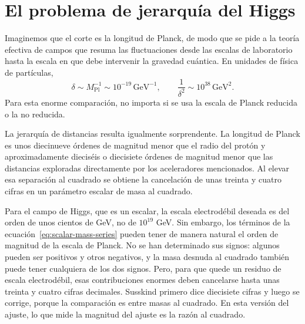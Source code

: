 \begin{classroomqa}
\end{classroomqa}

\begin{classroomqa}
\end{classroomqa}

\section{El problema de jerarquía del Higgs}

Imaginemos que el corte es la longitud de Planck, de modo que se pide a la teoría efectiva de campos que resuma las fluctuaciones desde las escalas de laboratorio hasta la escala en que debe intervenir la gravedad cuántica.
En unidades de física de partículas,
\begin{equation}
\delta\sim M_{\mathrm{Pl}}^{-1}\sim10^{-19}\,\mathrm{GeV}^{-1},
\qquad
\frac{1}{\delta^2}\sim10^{38}\,\mathrm{GeV}^2.
\label{eq:planck-cutoff}
\end{equation}
Para esta enorme comparación, no importa si se usa la escala de Planck reducida o la no reducida.

La jerarquía de distancias resulta igualmente sorprendente. La longitud de Planck es unos diecinueve órdenes de magnitud menor que el radio del protón y aproximadamente dieciséis o diecisiete órdenes de magnitud menor que las distancias exploradas directamente por los aceleradores mencionados. Al elevar esa separación al cuadrado se obtiene la cancelación de unas treinta y cuatro cifras en un parámetro escalar de masa al cuadrado.

Para el campo de Higgs, que es un escalar, la escala electrodébil deseada es del orden de unos cientos de GeV, no de \(10^{19}\) GeV. Sin embargo, los términos de la ecuación~\eqref{eq:scalar-mass-series} pueden tener de manera natural el orden de magnitud de la escala de Planck.
No se han determinado sus signos: algunos pueden ser positivos y otros negativos, y la masa desnuda al cuadrado también puede tener cualquiera de los dos signos. Pero, para que quede un residuo de escala electrodébil, esas contribuciones enormes deben cancelarse hasta unas treinta y cuatro cifras decimales. Susskind primero dice diecisiete cifras y luego se corrige, porque la comparación es entre masas al cuadrado. En esta versión del ajuste, lo que mide la magnitud del ajuste es la razón al cuadrado.

